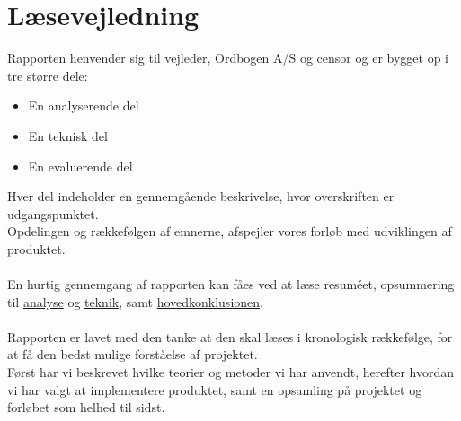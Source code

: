 \section{Læsevejledning}
Rapporten henvender sig til vejleder, Ordbogen A/S og censor og er bygget op i tre større dele:
\begin{itemize}
    \item{En analyserende del}
    \item{En teknisk del}
    \item{En evaluerende del}
\end{itemize}
Hver del indeholder en gennemgående beskrivelse, hvor overskriften er udgangspunktet. 
\\
Opdelingen og rækkefølgen af emnerne, afspejler vores forløb med udviklingen af produktet.
\\\\
En hurtig gennemgang af rapporten kan fåes ved at læse resuméet, opsummering til \hyperlink{delkonklusion-analyse}{analyse} og \hyperlink{delkonklusion-teknik}{teknik}, samt \hyperlink{konklusion}{hovedkonklusionen}.
\\\\
Rapporten er lavet med den tanke at den skal læses i kronologisk rækkefølge, for at få den bedst mulige forståelse af projektet.\\
Først har vi beskrevet hvilke teorier og metoder vi har anvendt, herefter hvordan vi har valgt at implementere produktet,
samt en opsamling på projektet og forløbet som helhed til sidst.

